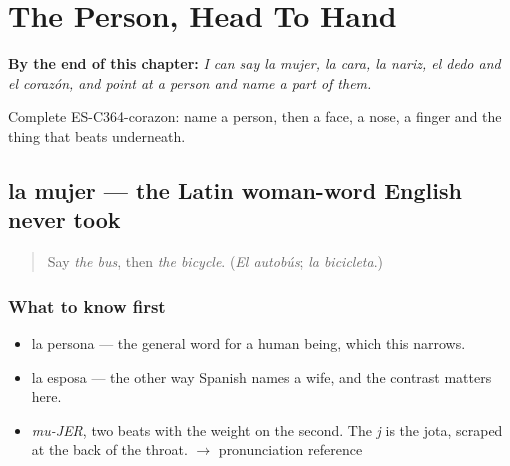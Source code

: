 
\chapter{The Person, Head To Hand}
\label{ch:la-mujer-y-la-cara}

\begin{chapteropening}
\textbf{By the end of this chapter:} \emph{I can say la mujer, la cara, la nariz, el dedo and el corazón, and point at a person and name a part of them.}

Complete ES-C364-corazon: name a person, then a face, a nose, a finger and the thing that beats underneath.
\end{chapteropening}

\section[la mujer]{la mujer — the Latin woman-word English never took}

\label{lesson:ES-C364-mujer}



\begin{quote}
Say \emph{the bus}, then \emph{the bicycle}. (\emph{El autobús}; \emph{la bicicleta}.)
\end{quote}

\subsection*{What to know first}
\begin{itemize}
\raggedright
  \item la persona — the general word for a human being, which this narrows.
  \item la esposa — the other way Spanish names a wife, and the contrast matters here.
\end{itemize}

\begin{sounds}
\begin{itemize}
\raggedright
  \item \emph{mu-JER}, two beats with the weight on the second. The \emph{j} is the jota, scraped at the back of the throat. $\to$ pronunciation reference
\end{itemize}
\end{sounds}


